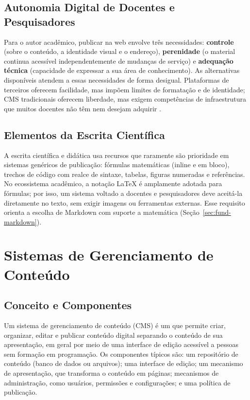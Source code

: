 \subsection{Autonomia Digital de Docentes e Pesquisadores}

Para o autor acadêmico, publicar na web envolve três necessidades: \textbf{controle} (sobre o conteúdo, a identidade visual e o endereço), \textbf{perenidade} (o material continua acessível independentemente de mudanças de serviço) e \textbf{adequação técnica} (capacidade de expressar a sua área de conhecimento). As alternativas disponíveis atendem a essas necessidades de forma desigual. Plataformas de terceiros oferecem facilidade, mas impõem limites de formatação e de identidade; CMS tradicionais oferecem liberdade, mas exigem competências de infraestrutura que muitos docentes não têm nem desejam adquirir \cite{mikkonen2010mashware,reis2026ic}.

\subsection{Elementos da Escrita Científica}

A escrita científica e didática usa recursos que raramente são prioridade em sistemas genéricos de publicação: fórmulas matemáticas (inline e em bloco), trechos de código com realce de sintaxe, tabelas, figuras numeradas e referências. No ecossistema acadêmico, a notação \LaTeX{} é amplamente adotada para fórmulas; por isso, um sistema voltado a docentes e pesquisadores deve aceitá-la diretamente no texto, sem exigir imagens ou ferramentas externas. Esse requisito orienta a escolha de Markdown com suporte a matemática (Seção~\ref{sec:fund-markdown}).

\section{Sistemas de Gerenciamento de Conteúdo}\label{sec:fund-cms}

\subsection{Conceito e Componentes}

Um sistema de gerenciamento de conteúdo (CMS) é um  que permite criar, organizar, editar e publicar conteúdo digital separando o conteúdo de sua apresentação, em geral por meio de uma interface de edição acessível a pessoas sem formação em programação. Os componentes típicos são: um repositório de conteúdo (banco de dados ou arquivos); uma interface de edição; um mecanismo de apresentação, que transforma o conteúdo em páginas; mecanismos de administração, como usuários, permissões e configurações; e uma política de publicação.

